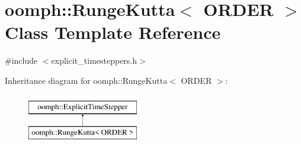 \hypertarget{classoomph_1_1RungeKutta}{}\section{oomph\+:\+:Runge\+Kutta$<$ O\+R\+D\+ER $>$ Class Template Reference}
\label{classoomph_1_1RungeKutta}


{\ttfamily \#include $<$explicit\+\_\+timesteppers.\+h$>$}

Inheritance diagram for oomph\+:\+:Runge\+Kutta$<$ O\+R\+D\+ER $>$\+:\begin{figure}[H]
\begin{center}
\leavevmode
\includegraphics[height=2.000000cm]{classoomph_1_1RungeKutta}
\end{center}
\end{figure}
